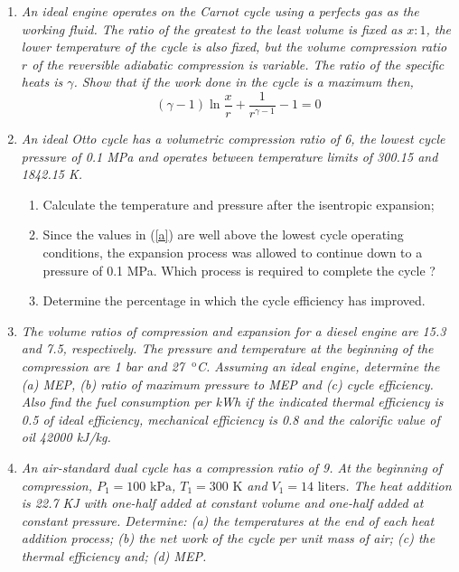 \documentclass[12pts,a4paper,amsmath,amssymb,floatfix]{article}%
\newcommand{\frc}{\displaystyle\frac}
\begin{document}
\begin{enumerate}[label=\bfseries Problem \arabic*]

\item {\it An ideal engine operates on the Carnot cycle using a perfects gas as the working fluid. The ratio of the greatest to the least volume is fixed as $x : 1$, the lower temperature of the cycle is also fixed, but the volume compression ratio $r$ of the reversible adiabatic compression is variable. The ratio of the specific heats is $\gamma$. Show that if the work done in the cycle is a maximum then,
\begin{displaymath}
  \left(\gamma-1\right)\ln\frc{x}{r}+\frc{1}{r^{\gamma-1}}-1=0
\end{displaymath}
}

\item {\it An ideal Otto cycle has a volumetric compression ratio of 6, the lowest cycle pressure of 0.1 MPa and operates between temperature limits of 300.15 and 1842.15 K.
\begin{enumerate}
\item \label{a}Calculate the temperature and pressure after the isentropic expansion;
\item Since the values in (\ref{a}) are well above the lowest cycle operating conditions, the expansion process was allowed to continue down to a pressure of 0.1 MPa. Which process is required to complete the cycle ? 
\item  Determine the percentage in which the cycle efficiency has improved.
\end{enumerate}
}

\item {\it The volume ratios of compression and expansion for a diesel engine are 15.3 and 7.5, respectively. The pressure and temperature at the beginning of the compression are 1 bar and 27 $^{\text{ o}}$C. Assuming an ideal engine, determine the (a) MEP, (b) ratio of maximum pressure to MEP and (c) cycle efficiency. Also find the fuel consumption per kWh if the indicated thermal efficiency is 0.5 of ideal efficiency, mechanical efficiency is 0.8 and the calorific value of oil 42000 kJ/kg. }



\item {\it An air-standard dual cycle has a compression ratio of 9. At the beginning of compression, $P_{1}=100\text{ kPa}$, $T_{1}=300\text{ K}$ and $V_{1}=14\text{ liters}$. The heat addition is 22.7 KJ with one-half added at constant volume and one-half added at constant pressure. Determine: (a) the temperatures at the end of each heat addition process; (b) the net work of the cycle per unit mass of air; (c) the thermal efficiency and; (d) MEP.}


\end{enumerate}
\end{document}
